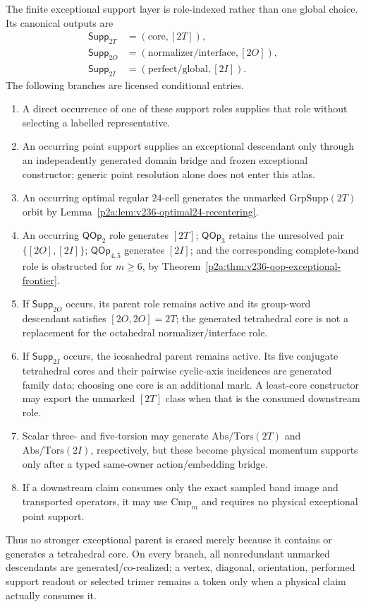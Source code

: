 \documentclass[12pt,a4paper]{article}
\begin{document}
\begin{theorem}
\label{p2e:thm:joint-exceptional-core-support-ledger}
The finite exceptional support layer is role-indexed rather than one global
choice.  Its canonical outputs are
\[
 \begin{aligned}
 \mathsf{Supp}_{2T}&=(\mathrm{core},[2T]),\\
 \mathsf{Supp}_{2O}&=(\mathrm{normalizer/interface},[2O]),\\
 \mathsf{Supp}_{2I}&=(\mathrm{perfect/global},[2I]).
 \end{aligned}
\]
The following branches are licensed conditional entries.
\begin{enumerate}[label=(\roman*),leftmargin=2.2em]
\item A direct occurrence of one of these support roles supplies that role
without selecting a labelled representative.
\item An occurring point support supplies an exceptional descendant only
through an independently generated domain bridge and frozen exceptional
constructor; generic point resolution alone does not enter this atlas.
\item An occurring optimal regular \(24\)-cell generates the unmarked
\(\mathrm{GrpSupp}(2T)\) orbit by
Lemma~\ref{p2a:lem:v236-optimal24-recentering}.
\item An occurring \(\mathsf{QOp}_2\) role generates \([2T]\);
\(\mathsf{QOp}_3\) retains the unresolved pair \(\{[2O],[2I]\}\);
\(\mathsf{QOp}_{4,5}\) generates \([2I]\); and the corresponding
complete-band role is obstructed for \(m\ge6\), by
Theorem~\ref{p2a:thm:v236-qop-exceptional-frontier}.
\item If \(\mathsf{Supp}_{2O}\) occurs, its parent role remains active and
its group-word descendant satisfies \([2O,2O]=2T\); the generated tetrahedral
core is not a replacement for the octahedral normalizer/interface role.
\item If \(\mathsf{Supp}_{2I}\) occurs, the icosahedral parent remains
active.  Its five conjugate tetrahedral cores and their pairwise cyclic-axis
incidences are generated family data; choosing one core is an additional mark.
A least-core constructor may export the unmarked \([2T]\) class when that is
the consumed downstream role.
\item Scalar three- and five-torsion may generate
\(\mathrm{Abs/Tors}(2T)\) and \(\mathrm{Abs/Tors}(2I)\), respectively, but
these become physical momentum supports only after a typed same-owner
action/embedding bridge.
\item If a downstream claim consumes only the exact sampled band image and
transported operators, it may use \(\mathrm{Cmp}_m\) and requires no physical
exceptional point support.
\end{enumerate}
Thus no stronger exceptional parent is erased merely because it contains or
generates a tetrahedral core.  On every branch, all nonredundant unmarked
descendants are generated/co-realized; a vertex, diagonal, orientation,
performed support readout or selected trimer remains a token only when a
physical claim actually consumes it.
\end{theorem}
\end{document}
